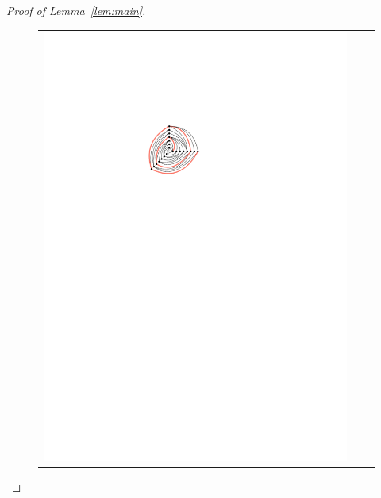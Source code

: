 \documentclass{jgaa-art}
\newcommand{\figlabel}[1]{\label{fig:#1}}
\newcommand{\lemref}[1]{Lemma~\ref{lem:#1}}
\begin{document}
\begin{proof}[Proof of \lemref{main}]

  \begin{figure}
  \begin{center}
  \begin{tabular}{ccc}
  \includegraphics{figs/prism_graph-2} &

\end{tabular}
\end{center}
\end{figure}
\end{proof}
\end{document}
